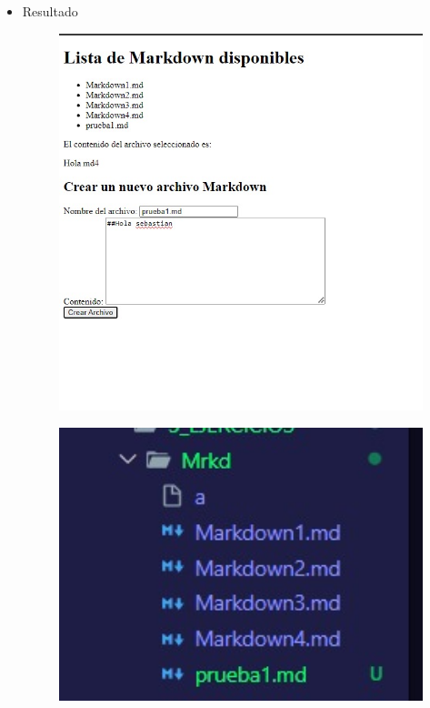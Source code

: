 \documentclass{article}
\begin{document}
\begin{itemize}
\begin{figure}[H]
		\end{figure}
		\item Resultado
		\begin{figure}[H]
			\centering
			\includegraphics[width=1.0\textwidth,keepaspectratio]{img/ResultT1.jpg}
		\end{figure}
		\begin{figure}[H]
			\centering
			\includegraphics[width=1.0\textwidth,keepaspectratio]{img/Result2T1.jpg}
		\end{figure}
	\end{itemize}
\end{document}
